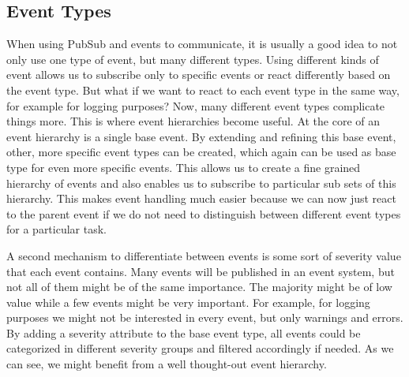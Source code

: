 \subsection{Event Types}

When using PubSub and events to communicate, it is usually a good idea to not only use one type of event, but many different types.
Using different kinds of event allows us to subscribe only to specific events or react differently based on the event type.
But what if we want to react to each event type in the same way, for example for logging purposes?
Now, many different event types complicate things more.
This is where event hierarchies become useful.
At the core of an event hierarchy is a single base event.
By extending and refining this base event, other, more specific event types can be created, which again can be used as base type for even more specific events.
This allows us to create a fine grained hierarchy of events and also enables us to subscribe to particular sub sets of this hierarchy.
This makes event handling much easier because we can now just react to the parent event if we do not need to distinguish between different event types for a particular task.

A second mechanism to differentiate between events is some sort of severity value that each event contains.
Many events will be published in an event system, but not all of them might be of the same importance.
The majority might be of low value while a few events might be very important.
For example, for logging purposes we might not be interested in every event, but only warnings and errors.
By adding a severity attribute to the base event type, all events could be categorized in different severity groups and filtered accordingly if needed.
As we can see, we might benefit from a well thought-out event hierarchy.

